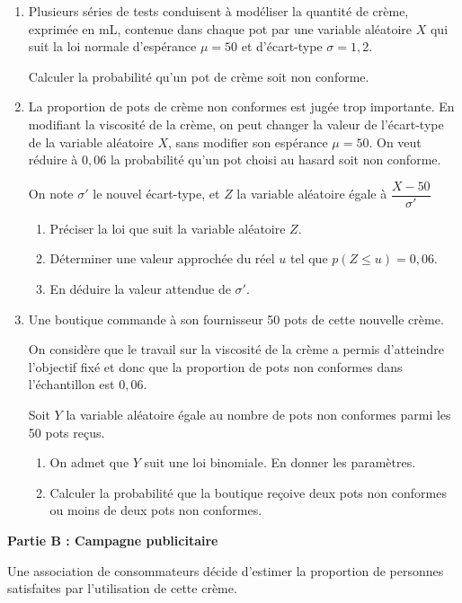 \documentclass[10pt]{article}
\begin{document}
\begin{enumerate}
\item Plusieurs séries de tests conduisent à modéliser la quantité de crème, exprimée en mL, contenue dans chaque pot par une variable aléatoire $X$ qui suit la loi normale d'espérance $\mu  = 50$ et d'écart-type $\sigma =  1,2$. 

Calculer la probabilité qu'un pot de crème soit non conforme. 
\item La proportion de pots de crème non conformes est jugée trop importante. En modifiant la viscosité de la crème, on peut changer la valeur de l'écart-type de la variable aléatoire $X$, sans modifier son espérance $\mu =  50$. On veut réduire à $0,06$ la probabilité qu'un pot choisi au hasard soit non conforme. 
 
On note $\sigma'$ le nouvel écart-type, et $Z$ la variable aléatoire égale à $\dfrac{X - 50}{\sigma'}$ 
	\begin{enumerate}
		\item Préciser la loi que suit la variable aléatoire $Z$. 
		\item Déterminer une valeur approchée du réel $u$ tel que $p(Z \leqslant u) = 0, 06$.
		\item En déduire la valeur attendue de $\sigma'$.
	\end{enumerate} 
\item Une boutique commande à son fournisseur 50 pots de cette nouvelle crème. 

On considère que le travail sur la viscosité de la crème a permis d'atteindre l'objectif fixé et donc que la proportion de pots non conformes dans l'échantillon est $0,06$.
 
Soit $Y$ la variable aléatoire égale au nombre de pots non conformes parmi les 50 pots reçus. 
	\begin{enumerate}
		\item On admet que $Y$ suit une loi binomiale. En donner les paramètres. 
		\item Calculer la probabilité que la boutique reçoive deux pots non conformes ou moins de deux pots non conformes.
	\end{enumerate}
\end{enumerate}

\bigskip
 
\textbf{Partie B : Campagne publicitaire}

\medskip
 
Une association de consommateurs décide d'estimer la proportion de personnes satisfaites par l'utilisation de cette crème.
 
\end{document}
